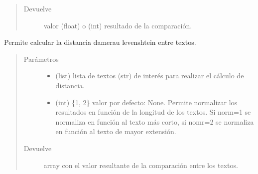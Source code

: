 \documentclass[letterpaper,10pt,openany,spanish]{sphinxmanual}
\begin{document}
\begin{fulllineitems}
\begin{fulllineitems}
\begin{quote}
\begin{description}
\item[{Devuelve}] \leavevmode
valor (float) o (int) resultado de la comparación.

\end{description}\end{quote}

\end{fulllineitems}


\begin{fulllineitems}
\label{\detokenize{funciones/comparacion:comparacion.DiferenciaStrings.distancia_damerau_levenshtein}}
Permite calcular la distancia damerau levenshtein entre textos.
\begin{quote}\begin{description}
\item[{Parámetros}] \leavevmode\begin{itemize}
\item {} 
 \textendash{} (list) lista de textos (str) de interés para realizar 
el cálculo de distancia.

\item {} 
 \textendash{} (int) \{1, 2\} valor por defecto: None. Permite normalizar 
los resultados en función de la longitud de los textos. 
Si norm=1 se normaliza en función al texto más corto, 
si nomr=2 se normaliza en función al texto de mayor extensión.

\end{itemize}

\item[{Devuelve}] \leavevmode
array con el valor resultante de la comparación entre los 
textos.

\end{description}\end{quote}

\end{fulllineitems}



\end{fulllineitems}
\end{document}
